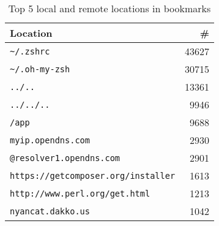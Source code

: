 \begin{table}
    \caption{Top 5 local and remote locations in bookmarks}
    \label{tab:bookmarks}
    \begin{tabular}{lr}
        \toprule
        Location & \# \\        
        \midrule
        \verb|~/.zshrc| & 43627 \\
        \verb|~/.oh-my-zsh| & 30715 \\
        \verb|../..| & 13361 \\
        \verb|../../..| & 9946 \\
        \verb|/app| & 9688 \\
        \midrule
        \verb|myip.opendns.com| & 2930 \\
        \verb|@resolver1.opendns.com| & 2901 \\
        \verb|https://getcomposer.org/installer| & 1613 \\
        \verb|http://www.perl.org/get.html| & 1213 \\
        \verb|nyancat.dakko.us| & 1042 \\        
        \bottomrule
    \end{tabular}
\end{table}
